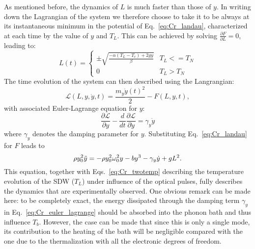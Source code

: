 As mentioned before, the dynamics of $L$ is much faster than those of $y$.
In writing down the Lagrangian of the system we therefore choose to take it to be always at its instantaneous minimum in the potential of Eq.~\ref{eq:Cr_landau}, characterized at each time by the value of $y$ and $T_L$.
This can be achieved by solving $\frac{\partial F}{\partial L} = 0$, leading to:
\begin{equation}
	\label{eq:Cr_L0}
	L(t) =
	\begin{cases}
		\pm \sqrt{\frac{- \alpha (T_L - T_c) + 2 g y}{\beta}} & T_L <= T_N\\
		0 & T_L > T_N
	\end{cases}
\end{equation}
The time evolution of the system can then described using the Langrangian:
\begin{equation}
    \mathcal{L}(L, y, \dot{y}, t) = \frac{m_y \dot{y}(t)^2}{2} - F(L, y, t),
\end{equation}
with associated Euler-Lagrange equation for $y$:
\begin{equation}
    \frac{\partial \mathcal{L}}{\partial y} - \frac{d}{dt}\frac{\partial \mathcal{L}}{\partial \dot{y}} = \gamma_y \dot{y}
\end{equation}
where $\gamma_y$ denotes the damping parameter for $y$.
Substituting Eq.~\ref{eq:Cr_landau} for $F$ leads to 
\begin{equation}
	\label{eq:Cr_euler_lagrange}
	    \rho y_0^2 \Ddot{y} = -\rho y_0^2 \omega_0^2 y  - b y^3 - \gamma_y \dot{y} + gL^2.
\end{equation}
This equation, together with Eqs.~\ref{eq:Cr_twotemp} describing the temperature evolution of the SDW ($T_L$) under influence of the optical pulses, fully describes the dynamics that are experimentally observed.
One obvious remark can be made here: to be completely exact, the energy dissipated through the damping term $\gamma_y$ in Eq.~\ref{eq:Cr_euler_lagrange} should be absorbed into the phonon bath and thus influence $T_b$.
However, the case can be made that since this is only a single mode, its contribution to the heating of the bath will be negligible compared with the one due to the thermalization with all the electronic degrees of freedom.

